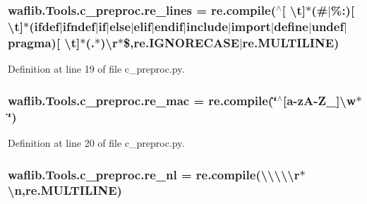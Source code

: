 \subsubsection[{\texorpdfstring{re\+\_\+lines}{re_lines}}]{\setlength{\rightskip}{0pt plus 5cm}waflib.\+Tools.\+c\+\_\+preproc.\+re\+\_\+lines = re.\+compile(\textquotesingle{}$^\wedge$\mbox{[} \textbackslash{}{\bf t}\mbox{]}$\ast$(\#$\vert$\%\+:)\mbox{[} \textbackslash{}{\bf t}\mbox{]}$\ast$(ifdef$\vert$ifndef$\vert${\bf if}$\vert$else$\vert$elif$\vert${\bf endif}$\vert$include$\vert$import$\vert$define$\vert$undef$\vert$pragma)\mbox{[} \textbackslash{}{\bf t}\mbox{]}$\ast$(.$\ast$)\textbackslash{}r$\ast$\$\textquotesingle{},re.\+I\+G\+N\+O\+R\+E\+C\+A\+SE$\vert$re.\+M\+U\+L\+T\+I\+L\+I\+NE)}\hypertarget{namespacewaflib_1_1_tools_1_1c__preproc_ada678a5cf9c24c522bee9fce52ad7b3e}{}\label{namespacewaflib_1_1_tools_1_1c__preproc_ada678a5cf9c24c522bee9fce52ad7b3e}


Definition at line 19 of file c\+\_\+preproc.\+py.

\subsubsection[{\texorpdfstring{re\+\_\+mac}{re_mac}}]{\setlength{\rightskip}{0pt plus 5cm}waflib.\+Tools.\+c\+\_\+preproc.\+re\+\_\+mac = re.\+compile(\char`\"{}$^\wedge$\mbox{[}a-\/zA-\/Z\+\_\+\mbox{]}\textbackslash{}w$\ast$\char`\"{})}\hypertarget{namespacewaflib_1_1_tools_1_1c__preproc_a67486b49834e1fbc67058e7b1efca8a4}{}\label{namespacewaflib_1_1_tools_1_1c__preproc_a67486b49834e1fbc67058e7b1efca8a4}


Definition at line 20 of file c\+\_\+preproc.\+py.

\subsubsection[{\texorpdfstring{re\+\_\+nl}{re_nl}}]{\setlength{\rightskip}{0pt plus 5cm}waflib.\+Tools.\+c\+\_\+preproc.\+re\+\_\+nl = re.\+compile(\textquotesingle{}\textbackslash{}\textbackslash{}\textbackslash{}\textbackslash{}\textbackslash{}r$\ast$\textbackslash{}n\textquotesingle{},re.\+M\+U\+L\+T\+I\+L\+I\+NE)}\hypertarget{namespacewaflib_1_1_tools_1_1c__preproc_abe79057a8d61c1b16bdce5c8502f9488}{}\label{namespacewaflib_1_1_tools_1_1c__preproc_abe79057a8d61c1b16bdce5c8502f9488}


